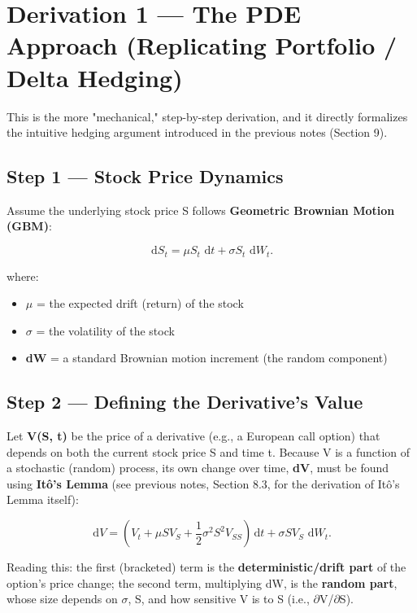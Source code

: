 \documentclass[12pt,openany]{book}
\theoremstyle{definition}
\theoremstyle{remark}
\newcommand{\dd}{\,\mathrm{d}}
\begin{document}
\section{Derivation 1 --- The PDE Approach (Replicating Portfolio / Delta Hedging)}

This is the more "mechanical," step-by-step derivation, and it directly formalizes the intuitive hedging argument introduced in the previous notes (Section 9).

\subsection{Step 1 --- Stock Price Dynamics}

Assume the underlying stock price S follows \textbf{Geometric Brownian Motion (GBM)}:

\[\dd S_t=\mu S_t\,\dd t+\sigma S_t\,\dd W_t.\]

where:

\begin{itemize}
\item \textbf{\(\mu\)} = the expected drift (return) of the stock


\item \textbf{\(\sigma\)} = the volatility of the stock


\item \textbf{dW} = a standard Brownian motion increment (the random component)


\end{itemize}

\subsection{Step 2 --- Defining the Derivative's Value}

Let \textbf{V(S, t)} be the price of a derivative (e.g., a European call option) that depends on both the current stock price S and time t. Because V is a function of a stochastic (random) process, its own change over time, \textbf{dV}, must be found using \textbf{Itô's Lemma} (see previous notes, Section 8.3, for the derivation of Itô's Lemma itself):

\[
\dd V=\left(V_t+\mu S V_S+\frac12\sigma^2S^2V_{SS}\right)\dd t
      +\sigma S V_S\,\dd W_t.
\]

Reading this: the first (bracketed) term is the \textbf{deterministic/drift part} of the option's price change; the second term, multiplying dW, is the \textbf{random part}, whose size depends on \(\sigma\), S, and how sensitive V is to S (i.e., \(\partial\)V/\(\partial\)S).
\end{document}
